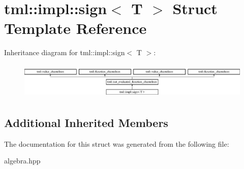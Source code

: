 \hypertarget{structtml_1_1impl_1_1sign}{\section{tml\+:\+:impl\+:\+:sign$<$ T $>$ Struct Template Reference}
\label{structtml_1_1impl_1_1sign}
}
Inheritance diagram for tml\+:\+:impl\+:\+:sign$<$ T $>$\+:\begin{figure}[H]
\begin{center}
\leavevmode
\includegraphics[height=1.750000cm]{structtml_1_1impl_1_1sign}
\end{center}
\end{figure}
\subsection*{Additional Inherited Members}


The documentation for this struct was generated from the following file\+:\begin{DoxyCompactItemize}
\item 
algebra.\+hpp\end{DoxyCompactItemize}
